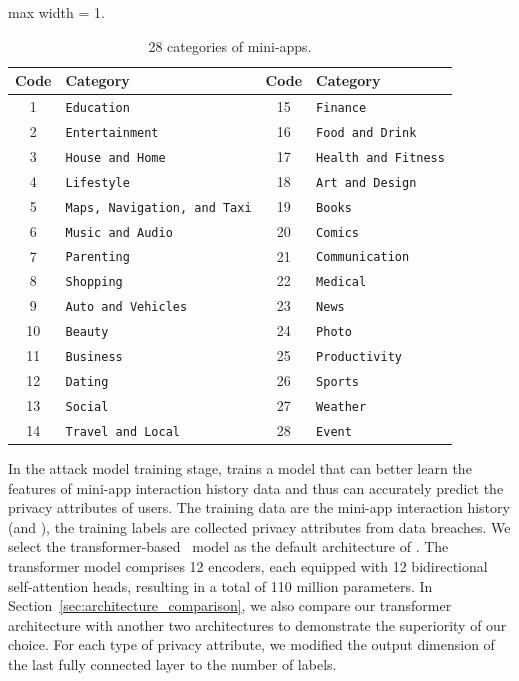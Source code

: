 \begin{table}[!tb]
\centering
\caption{28 categories of mini-apps.}
\vspace{-1em}
\label{tab:category}
\begin{adjustbox}{max width = 1.\columnwidth}
\begin{tabular}{@{}cl|cl@{}}
\hline
\textbf{Code} & \textbf{Category} & \textbf{Code} & \textbf{Category} \\ \hline
1 & \texttt{Education} & 15 & \texttt{Finance} \\
2 & \texttt{Entertainment} & 16 & \texttt{Food and Drink} \\
3 & \texttt{House and Home} & 17 & \texttt{Health and Fitness} \\
4 & \texttt{Lifestyle} & 18 & \texttt{Art and Design} \\
5 & \texttt{Maps, Navigation, and Taxi} & 19 & \texttt{Books} \\
6 & \texttt{Music and Audio} & 20 & \texttt{Comics} \\
7 & \texttt{Parenting} & 21 & \texttt{Communication} \\
8 & \texttt{Shopping} & 22 & \texttt{Medical} \\
9 & \texttt{Auto and Vehicles} & 23 & \texttt{News} \\
10 & \texttt{Beauty} & 24 & \texttt{Photo} \\
11 & \texttt{Business} & 25 & \texttt{Productivity} \\
12 & \texttt{Dating} & 26 & \texttt{Sports} \\
13 & \texttt{Social} & 27 & \texttt{Weather} \\
14 & \texttt{Travel and Local} & 28 & \texttt{Event} \\ \hline
\end{tabular}
\end{adjustbox}
\vspace{-1em}
\end{table}

In the attack model training stage, \tool trains a model that can better
learn the features of mini-app interaction history data and thus can accurately
predict the privacy attributes of users. The training data are the mini-app
interaction history (\mini and \op), the training labels are
collected privacy attributes from data breaches. We select the
transformer-based~\cite{vaswani2017attention} model as the default architecture
of \tool. The transformer model comprises 12 encoders, each equipped with
12 bidirectional self-attention heads, resulting in a total of 110 million parameters. In Section~\ref{sec:architecture_comparison}, we also compare our transformer
architecture with another two architectures to demonstrate the superiority of
our choice. For each type of privacy attribute, we modified the output dimension of
the last fully connected layer to the number of labels.


